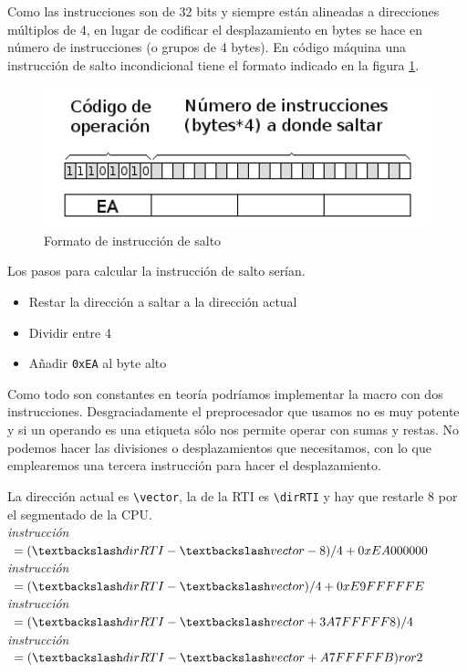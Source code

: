 Como las instrucciones son de 32 bits y siempre están alineadas a direcciones múltiplos
de 4, en lugar de codificar el desplazamiento en bytes se hace en número de
instrucciones (o grupos de 4 bytes). En código máquina una instrucción de salto
incondicional tiene el formato indicado en la figura \ref{fig:codsalto}.

\begin{figure}[h]
  \centering
    \includegraphics[width=14cm]{graphs/codsalto.png}
  \caption{Formato de instrucción de salto}
  \label{fig:codsalto}
\end{figure}

Los pasos para calcular la instrucción de salto serían.

\begin{itemize}
  \item Restar la dirección a saltar a la dirección actual
  \item Dividir entre 4
  \item Añadir {\tt 0xEA} al byte alto
\end{itemize}

Como todo son constantes en teoría podríamos implementar la
macro con dos instrucciones. Desgraciadamente el preprocesador
que usamos no es muy potente y si un operando es una etiqueta
sólo nos permite operar con sumas y restas. No podemos hacer las
divisiones o desplazamientos que necesitamos, con lo que emplearemos
una tercera instrucción para hacer el desplazamiento.

La dirección actual es {\tt \textbackslash vector}, la de la RTI
es {\tt \textbackslash dirRTI} y hay que restarle 8 por el
segmentado de la CPU.
\\
{\it instrucción }$ = (\textbackslash dirRTI-\textbackslash vector-8)/4 + 0xEA000000$ \\
{\it instrucción }$ = (\textbackslash dirRTI-\textbackslash vector)/4 + 0xE9FFFFFE$ \\
{\it instrucción }$ = (\textbackslash dirRTI-\textbackslash vector+3A7FFFFF8)/4$ \\
{\it instrucción }$ = (\textbackslash dirRTI-\textbackslash vector+A7FFFFFB) ror 2$

